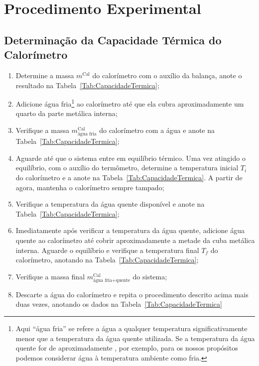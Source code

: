 \section{Procedimento Experimental}

\subsection{Determinação da Capacidade Térmica do Calorímetro} %
\begin{enumerate}
	\item Determine a massa $m^{\text{Cal}}$ do calorímetro com o auxílio da balança, anote o resultado na Tabela~\ref{Tab:CapacidadeTermica};
	\item Adicione água fria\footnote{Aqui ``água fria'' se refere a água a qualquer temperatura significativamente menor que a temperatura da água quente utilizada. Se a temperatura da água quente for de aproximadamente , por exemplo, para os nossos propósitos podemos considerar água à temperatura ambiente como fria.} ao calorímetro até que ela cubra aproximadamente um quarto da parte metálica interna;
	\item Verifique a massa $m^{\text{Cal}}_{\text{água fria}}$ do calorímetro com a água e anote na Tabela~\ref{Tab:CapacidadeTermica};
	\item Aguarde até que o sistema entre em equilíbrio térmico. Uma vez atingido o equilíbrio, com o auxílio do termômetro, determine a temperatura inicial $T_i$ do calorímetro e a anote na Tabela~\ref{Tab:CapacidadeTermica}. A partir de agora, mantenha o calorímetro sempre tampado;
	\item Verifique a temperatura da água quente disponível e anote na Tabela~\ref{Tab:CapacidadeTermica};
	\item Imediatamente após verificar a temperatura da água quente, adicione água quente ao calorímetro até cobrir aproximadamente a metade da cuba metálica interna. Aguarde o equilíbrio e verifique a temperatura final $T_f$ do calorímetro, anotando na Tabela~\ref{Tab:CapacidadeTermica};
	\item Verifique a massa final $m^{\text{Cal}}_{\text{água fria+quente}}$ do sistema;
	\item Descarte a água do calorímetro e repita o procedimento descrito acima mais duas vezes, anotando os dados na Tabela~\ref{Tab:CapacidadeTermica}
\end{enumerate}

